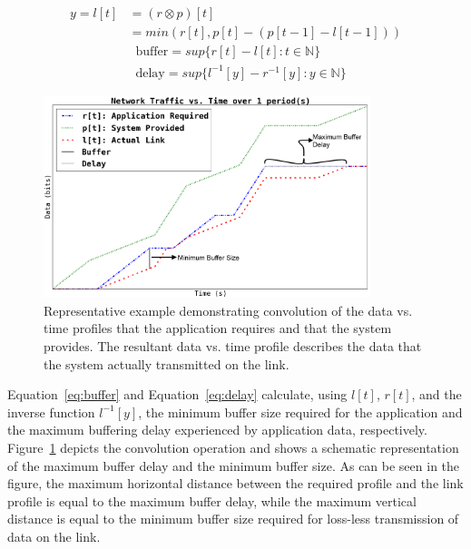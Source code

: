 \begin{equation}
	\label{eq:convolution}
	\begin{split}
		y=l[t] &= (r \otimes p)[t] \\
		&= min( r[t] , p[t] - (p[t-1] - l[t-1]) )
	\end{split}
\end{equation}
\vspace{-0.5in}
\begin{align}
	\label{eq:buffer}
	&\text{buffer}= sup\{r[t] - l[t] : t \in \mathbb{N}\}\\
	\label{eq:delay}
	&\text{delay} = sup\{l^{-1}[y]-r^{-1}[y] : y \in \mathbb{N}\}
\end{align}

\begin{figure}[h!]
	\centering
	\includegraphics[width=0.85\textwidth]{figs/convolution6.png}
	\caption{Representative example demonstrating convolution of the data vs. time profiles that the application requires and that the system provides.  The resultant data vs. time profile describes the data that the system actually transmitted on the link.}
	\label{fig:convolution}
\end{figure}

Equation~\ref{eq:buffer} and Equation~\ref{eq:delay} calculate, using $l[t]$, $r[t]$, and the inverse function $l^{-1}[y]$, the minimum buffer size required for the application and the maximum buffering delay experienced by application data, respectively.  Figure~\ref{fig:convolution} depicts the convolution operation and shows a schematic representation of the maximum buffer delay and the minimum buffer size.  As can be seen in the figure, the maximum horizontal distance between the required profile and the link profile is equal to the maximum buffer delay, while the maximum vertical distance is equal to the minimum buffer size required for loss-less transmission of data on the link.

